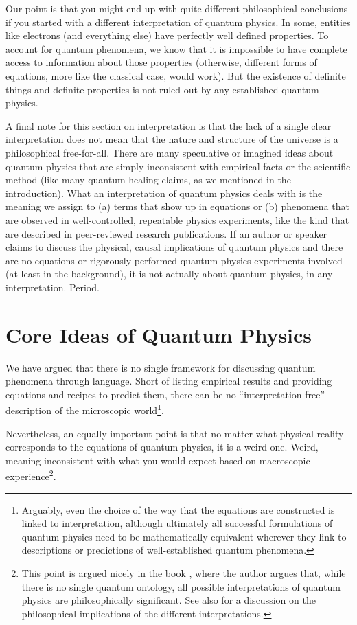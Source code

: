 \documentclass[onecolumn,preprintnumbers,amsmath,amssymbn,reprint,nofootinbib,superscriptaddress]{revtex4}    %
\begin{document}
Our point is that you might end up with quite different philosophical conclusions if you started with a different interpretation of quantum physics.  In some, entities like electrons (and everything else) have perfectly well defined properties.  To account for quantum phenomena, we know that it is impossible to have complete access to information about those properties (otherwise, different forms of equations, more like the classical case, would work).  But the existence of definite things and definite properties is not ruled out by any established quantum physics.

A final note for this section on interpretation is that the lack of a single clear interpretation does not mean that the nature and structure of the universe is a philosophical free-for-all.  There are many speculative or imagined ideas about quantum physics that are simply inconsistent with empirical facts or the scientific method (like many quantum healing claims, as we mentioned in the introduction).  What an interpretation of quantum physics deals with is the meaning we assign to (a) terms that show up in equations or (b) phenomena that are observed in well-controlled, repeatable physics experiments, like the kind that are described in peer-reviewed research publications. If an author or speaker claims to discuss the physical, causal implications of quantum physics and there are no equations or rigorously-performed quantum physics experiments involved (at least in the background), it is not actually about quantum physics, in any interpretation.  Period.

\section{Core Ideas of Quantum Physics}

We have argued that there is no single framework for discussing quantum phenomena through language.  Short of listing empirical results and providing equations and recipes to predict them, there can be no ``interpretation-free'' description of the microscopic world\footnote{Arguably, even the choice of the way that the equations are constructed is linked to interpretation, although ultimately all successful formulations of quantum physics need to be mathematically equivalent wherever they link to descriptions or predictions of well-established quantum phenomena.}.

Nevertheless, an equally important point is that no matter what physical reality corresponds to the equations of quantum physics, it is a weird one.  Weird, meaning inconsistent with what you would expect based on macroscopic experience\footnote{This point is argued nicely in the book \cite{ontology}, where the author argues that, while there is no single quantum ontology, all possible interpretations of quantum physics are philosophically significant. See also \cite{Pessoa} for a discussion on the philosophical implications of the different interpretations.}.
\end{document}
